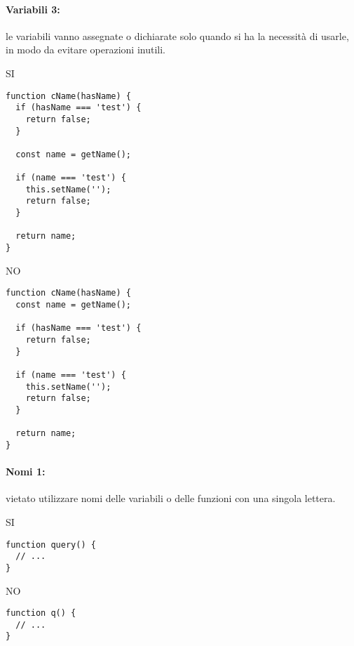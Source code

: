\documentclass[../ProcessiPrimari.tex]{subfiles}
\begin{document}
\paragraph{Variabili 3:}le variabili vanno assegnate o dichiarate solo quando si ha la necessità di usarle, in modo da evitare operazioni inutili.
\begin{center}{
\begin{minipage}{6cm}
	{\begin{center}SI\end{center}}
	\begin{Verbatim}[frame=single]
function cName(hasName) {
  if (hasName === 'test') {
    return false;
  }

  const name = getName();

  if (name === 'test') {
    this.setName('');
    return false;
  }

  return name;
}
	\end{Verbatim}
\end{minipage}
\hfil
\begin{minipage}{6cm}
	{\begin{center}NO\end{center}}
	\begin{Verbatim}[frame=single]
function cName(hasName) {
  const name = getName();

  if (hasName === 'test') {
    return false;
  }

  if (name === 'test') {
    this.setName('');
    return false;
  }

  return name;
}	
\end{Verbatim}
\end{minipage}
}
\end{center}
\paragraph{Nomi 1:}vietato utilizzare nomi delle variabili o delle funzioni con una singola lettera.
\begin{center}{
		\begin{minipage}{4.5cm}
			{\begin{center}SI\end{center}}
			\begin{Verbatim}[frame=single]
function query() {
  // ...
}
			\end{Verbatim}
		\end{minipage}
		\hfil
		\begin{minipage}{4.5cm}
			{\begin{center}NO\end{center}}
			\begin{Verbatim}[frame=single]
function q() {
  // ...
}
		\end{Verbatim}
		\end{minipage}
	}
\end{center}
\end{document}
